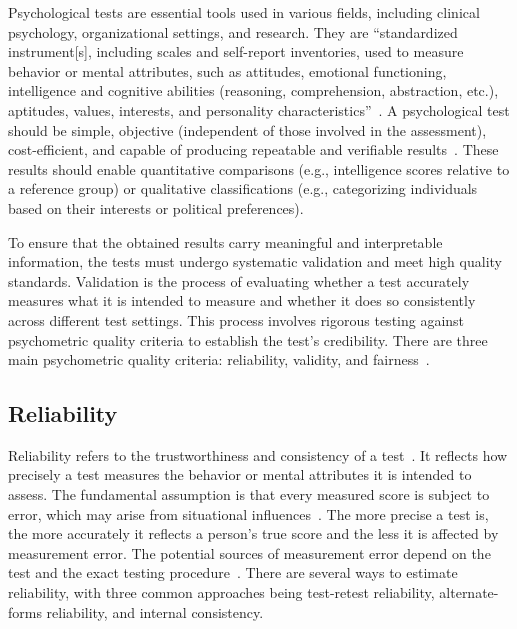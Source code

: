 \documentclass{DESSThesis}
\begin{document}
Psychological tests are essential tools used in various fields, including clinical psychology, organizational settings, and research. They are ``standardized instrument[s], including scales and self-report inventories, used to measure behavior or mental attributes, such as attitudes, emotional functioning, intelligence and cognitive abilities (reasoning, comprehension, abstraction, etc.), aptitudes, values, interests, and personality characteristics''~\cite{apa_dictionary_of_psychology_psychological_2018}. A psychological test should be simple, objective (independent of those involved in the assessment), cost-efficient, and capable of producing repeatable and verifiable results~\cite{moosbrugger_testtheorie_2020}. These results should enable quantitative comparisons (e.g., intelligence scores relative to a reference group) or qualitative classifications (e.g., categorizing individuals based on their interests or political preferences). 

To ensure that the obtained results carry meaningful and interpretable information, the tests must undergo systematic validation and meet high quality standards. Validation is the process of evaluating whether a test accurately measures what it is intended to measure and whether it does so consistently across different test settings. This process involves rigorous testing against psychometric quality criteria to establish the test's credibility. There are three main psychometric quality criteria:  reliability, validity, and fairness~\cite{american_educational_research_association_standards_2014}.

\subsection{Reliability}
\label{sec:background-reliability}
Reliability refers to the trustworthiness and consistency of a test~\cite{apa_dictionary_of_psychology_reliability_2018}. It reflects how precisely a test measures the behavior or mental attributes it is intended to assess. The fundamental assumption is that every measured score is subject to error, which may arise from situational influences~\cite{rammstedt_reliabilitat_2010}. The more precise a test is, the more accurately it reflects a person's true score and the less it is affected by measurement error. The potential sources of measurement error depend on the test and the exact testing procedure~\cite{american_educational_research_association_standards_2014}. There are several ways to estimate reliability, with three common approaches being test-retest reliability, alternate-forms reliability, and internal consistency.
\end{document}
